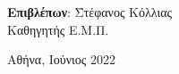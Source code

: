 \begin{titlepage}
\begin{center}
\begin{flushleft}
\begin{tabbing}
            \textbf{Επιβλέπων}: \= Στέφανος Κόλλιας \\
                                \> Καθηγητής Ε.Μ.Π.
        \end{tabbing}
        \end{flushleft}

            
        \vspace{2.5cm}
            

        

        Αθήνα, Ιούνιος 2022
            
    \end{center}
\end{titlepage}
